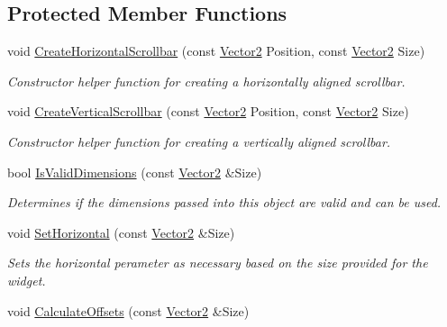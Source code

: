\subsection*{Protected Member Functions}
\begin{DoxyCompactItemize}
\item 
void \hyperlink{classphys_1_1UI_1_1Scrollbar_af1d5ab4a11a71a1d0c5e6feb4cc88843}{CreateHorizontalScrollbar} (const \hyperlink{classphys_1_1Vector2}{Vector2} Position, const \hyperlink{classphys_1_1Vector2}{Vector2} Size)
\begin{DoxyCompactList}\small\item\em Constructor helper function for creating a horizontally aligned scrollbar. \item\end{DoxyCompactList}\item 
void \hyperlink{classphys_1_1UI_1_1Scrollbar_a337378d76c9d1c05606c0498e16dac4d}{CreateVerticalScrollbar} (const \hyperlink{classphys_1_1Vector2}{Vector2} Position, const \hyperlink{classphys_1_1Vector2}{Vector2} Size)
\begin{DoxyCompactList}\small\item\em Constructor helper function for creating a vertically aligned scrollbar. \item\end{DoxyCompactList}\item 
bool \hyperlink{classphys_1_1UI_1_1Scrollbar_a4953ac8c0b711ed9c1be468897e09ce8}{IsValidDimensions} (const \hyperlink{classphys_1_1Vector2}{Vector2} \&Size)
\begin{DoxyCompactList}\small\item\em Determines if the dimensions passed into this object are valid and can be used. \item\end{DoxyCompactList}\item 
void \hyperlink{classphys_1_1UI_1_1Scrollbar_acb5622bfb508d54f7802811e5dda4704}{SetHorizontal} (const \hyperlink{classphys_1_1Vector2}{Vector2} \&Size)
\begin{DoxyCompactList}\small\item\em Sets the horizontal perameter as necessary based on the size provided for the widget. \item\end{DoxyCompactList}\item 
void \hyperlink{classphys_1_1UI_1_1Scrollbar_a4621d6713a059196f1a358a23b9ad5ae}{CalculateOffsets} (const \hyperlink{classphys_1_1Vector2}{Vector2} \&Size)

\end{DoxyCompactItemize}
